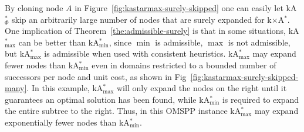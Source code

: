 \documentclass[smallextended]{svjour3}       %
\newcommand{\omspp}{\ac{OMSPP}\xspace}
\newcommand{\kastarvar}[1]{\textup{kA}$^*_{#1}$\xspace}
\newcommand{\kastarmin}{\kastarvar{\min}}
\newcommand{\kastarmax}{\kastarvar{\max}}
\newcommand{\kastarphi}{\textup{kA}$^*_{\Phi}$\xspace}
\newcommand{\kxastar}{k$\times$A$^*$\xspace}
\newcommand{\axiomadm}{admissible\xspace}
\begin{document}
By cloning node $A$ in Figure~\ref{fig:kastarmax-surely-skipped} one can easily let \kastarphi skip an arbitrarily large number of nodes that are surely expanded for \kxastar. 
One implication of Theorem~\ref{the:admissible-surely} is that in some situations, \kastarmax can be better than \kastarmin, since $\min$ is \axiomadm, $\max$ is not \axiomadm, but \kastarmax is admissible when used with consistent heuristics. 
\kastarmax may expand fewer nodes than \kastarmin even in domains restricted to a bounded number of successors per node and unit cost, as shown in Fig~\ref{fig:kastarmax-surely-skipped-many}.
In this example, \kastarmax will only expand the nodes on the right until it guarantees an optimal solution has been found, while \kastarmin is required to expand the entire subtree to the right. Thus, in this \omspp instance \kastarmax may expand exponentially fewer nodes than \kastarmin. 
\end{document}
